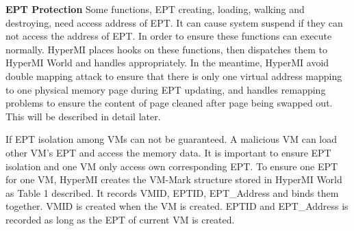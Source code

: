 \documentclass[conference]{IEEEtran}
\begin{document}
\textbf{EPT Protection}
Some functions, EPT creating, loading, walking and destroying, need access address of EPT. It can cause system suspend if they can not access the address of EPT. In order to ensure these functions can execute normally. HyperMI places hooks on these functions, then dispatches them to HyperMI World and handles appropriately. In the meantime, HyperMI avoid double mapping attack to ensure that there is only one virtual address mapping to one physical memory page during EPT updating, and handles remapping problems to ensure the content of page cleaned after page being swapped out. This will be described in detail later.

If EPT isolation among VMs can not be guaranteed. A malicious VM can load other VM's EPT and access the memory data. It is important to ensure EPT isolation and one VM only access own corresponding EPT.
To ensure one EPT for one VM, HyperMI creates the VM-Mark structure stored in HyperMI World as Table 1 described. It records VMID, EPTID, EPT\_Address and binds them together. VMID is created when the VM is created. 
 EPTID and EPT\_Address is recorded as long as the EPT of current VM is created.


%
\end{document}

